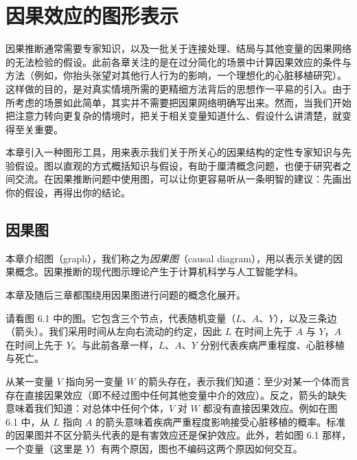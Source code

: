 \chapter{因果效应的图形表示}

因果推断通常需要专家知识，以及一批关于连接处理、结局与其他变量的因果网络的无法检验的假设。此前各章关注的是在过分简化的场景中计算因果效应的条件与方法（例如，你抬头张望对其他行人行为的影响，一个理想化的心脏移植研究）。这样做的目的，是对真实情境所需的更精细方法背后的思想作一平易的引入。由于所考虑的场景如此简单，其实并不需要把因果网络明确写出来。然而，当我们开始把注意力转向更复杂的情境时，把关于相关变量知道什么、假设什么讲清楚，就变得至关重要。

本章引入一种图形工具，用来表示我们关于所关心的因果结构的定性专家知识与先验假设。图以直观的方式概括知识与假设，有助于厘清概念问题，也便于研究者之间交流。在因果推断问题中使用图，可以让你更容易听从一条明智的建议：先画出你的假设，再得出你的结论。

\section{因果图}

本章介绍图（graph），我们称之为\emph{因果图}（causal diagram），用以表示关键的因果概念。因果推断的现代图示理论产生于计算机科学与人工智能学科。


本章及随后三章都围绕用因果图进行问题的概念化展开。

请看图 6.1 中的图。它包含三个节点，代表随机变量（$L$、$A$、$Y$），以及三条边（箭头）。我们采用时间从左向右流动的约定，因此 $L$ 在时间上先于 $A$ 与 $Y$，$A$ 在时间上先于 $Y$。与此前各章一样，$L$、$A$、$Y$ 分别代表疾病严重程度、心脏移植与死亡。

\begin{figure}[htbp]
\centering
{}
\caption{}
\label{fig:6.1}
\end{figure}

从某一变量 $V$ 指向另一变量 $W$ 的箭头存在，表示我们知道：至少对某一个体而言存在直接因果效应（即不经过图中任何其他变量中介的效应）。反之，箭头的缺失意味着我们知道：对总体中任何个体，$V$ 对 $W$ 都没有直接因果效应。例如在图 6.1 中，从 $L$ 指向 $A$ 的箭头意味着疾病严重程度影响接受心脏移植的概率。标准的因果图并不区分箭头代表的是有害效应还是保护效应。此外，若如图 6.1 那样，一个变量（这里是 $Y$）有两个原因，图也不编码这两个原因如何交互。

